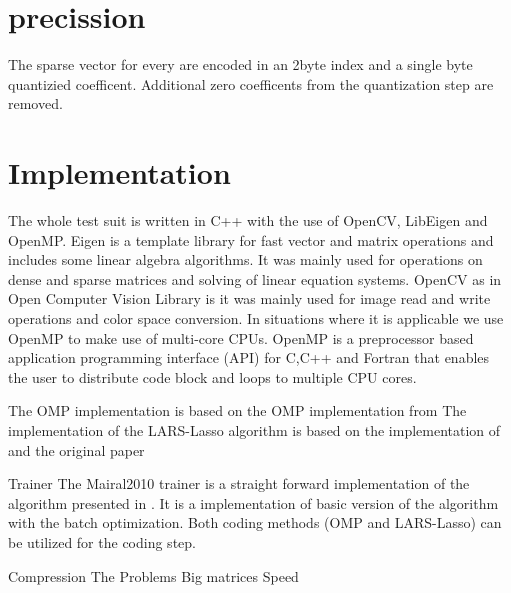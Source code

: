 \section{precission}
The sparse vector for every are encoded in an 2byte index and a single byte quantizied coefficent. Additional zero coefficents from the quantization step are removed.




\section{Implementation}
%

The whole test suit is written in C++ with the use of OpenCV, LibEigen and OpenMP.
Eigen \cite{Eigen} is a template library for fast vector and matrix operations and includes some linear algebra algorithms.
It was mainly used for operations on dense and sparse matrices and solving of linear equation systems.
OpenCV \cite{OpenCV} as in Open Computer Vision Library is it was mainly used for image read and write operations and color space conversion.
In situations where it is applicable we use OpenMP to make use of multi-core CPUs. OpenMP \cite{OpenMP}
is a preprocessor based application programming interface (API) for C,C++ and Fortran that enables 
the user to distribute code block and loops to multiple CPU cores. 

The OMP implementation is based on the OMP implementation from \cite{Rubinstein}
The implementation of the LARS-Lasso algorithm is based on the implementation of \cite{Strand2005} and the original paper \cite{Efron2004}

Trainer
The Mairal2010 trainer is a straight forward implementation of the algorithm presented in \cite{Mairal2010}.
It is a implementation of basic version of the algorithm with the batch optimization. 
Both coding methods (OMP and LARS-Lasso) can be utilized for the coding step.


Compression
The 
Problems
Big matrices
Speed 

